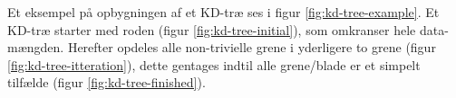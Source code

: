 Et eksempel på opbygningen af et KD-træ ses i figur \ref{fig:kd-tree-example}. Et KD-træ starter med roden (figur \ref{fig:kd-tree-initial}), som omkranser hele data-mængden. Herefter opdeles alle non-trivielle grene i yderligere to grene (figur \ref{fig:kd-tree-itteration}), dette gentages indtil alle grene/blade er et simpelt tilfælde (figur \ref{fig:kd-tree-finished}).